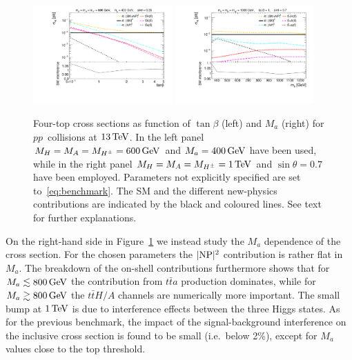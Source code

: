 \documentclass[a4paper, 11pt,notoc]{article}
\newcommand{\mA}{\ensuremath{M_{A}}\xspace}
\newcommand{\ma}{\ensuremath{M_{a}}\xspace}
\newcommand{\mH}{\ensuremath{M_{H}}\xspace}
\newcommand{\mHc}{\ensuremath{M_{H^{\pm}}}\xspace}
\begin{document}
 \begin{figure}[!t]
\centering
\includegraphics[width=0.475\textwidth]{plot_tb.pdf} \quad 
\includegraphics[width=0.475\textwidth]{plot_ma.pdf}
\vspace{4mm}
\caption{\label{fig:4top} Four-top cross sections as function of $\tan \beta$ (left) and $\ma$ (right) for $pp$~collisions at $13 \, {\rm TeV}$.   In the left panel $\mH =\mA=\mHc = 600 \, {\rm GeV}$ and  $\ma = 400 \, {\rm GeV}$ have been used, while in the right panel $\mH =\mA=\mHc = 1 \, {\rm TeV}$ and  $\sin \theta = 0.7$ have been employed. Parameters not explicitly specified are set to~\eqref{eq:benchmark}.  The SM and the different new-physics contributions are indicated by the black and coloured lines. See text for further explanations.}
\end{figure}

On the right-hand side in Figure~\ref{fig:4top} we instead  study the $\ma$ dependence of the cross section. For the chosen parameters the $|{\rm NP}|^2$ contribution is rather flat in $\ma$. The breakdown of the on-shell contributions furthermore shows that for $\ma \lesssim 800 \, {\rm GeV}$ the contribution from $t \bar t a$ production dominates, while for $\ma \gtrsim 800 \, {\rm GeV}$ the $t \bar t H/A$ channels are numerically more important. The small bump at $1 \, {\rm TeV}$ is due to interference effects between the three Higgs states.  As for the previous benchmark,  the impact of the signal-background interference on the inclusive cross section is found to be small (i.e.~below 2\%), except for $\ma$ values close to the top threshold. 
\end{document}
